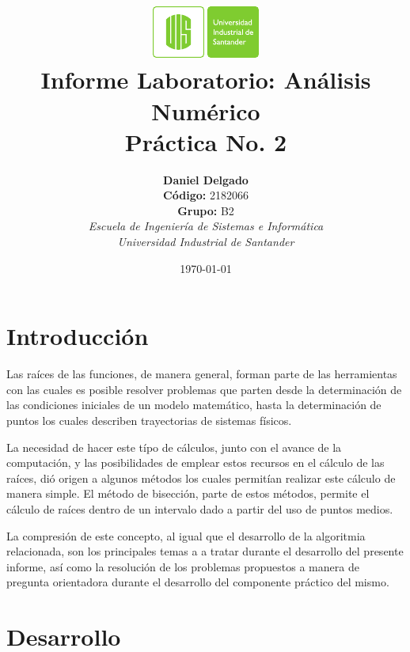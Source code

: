 \documentclass[english,notitlepage,letterpaper, 10pt]{article} %
\newcommand{\university}{\normalsize Universidad Industrial de Santander}
\newcommand{\faculty}{\normalsize  Escuela de Ingenier\'ia de Sistemas e Inform\'atica}
\newcommand{\codigo}{\normalsize  2182066}
\begin{document}
\title{	\vspace{-12mm}\includegraphics[width=0.2\linewidth]{Logos/UIS.pdf}\\Informe Laboratorio: An\'alisis Num\'erico\\  \centering Pr\'actica No. 2}
\author{
\textbf{Daniel Delgado} \\ \textbf{C\'odigo:} \codigo\\
\textbf{Grupo:} B2\\
\textit{\faculty}\\
\textit{\university}}
\date{\today}
\maketitle

\section{Introducci\'on}

Las raíces de las funciones, de manera general, forman parte de las herramientas con las cuales es posible resolver problemas que parten desde la determinación de las condiciones iniciales de un modelo matemático, hasta la determinación de puntos los cuales describen trayectorias de sistemas físicos. 

La necesidad de hacer este típo de cálculos, junto con el avance de la computación, y las posibilidades de emplear estos recursos en el cálculo de las raíces, dió origen a algunos métodos los cuales permitían realizar este cálculo de manera simple. El método de bisección, parte de estos métodos, permite el cálculo de raíces dentro de un intervalo dado a partir del uso de puntos medios. 

La compresión de este concepto, al igual que el desarrollo de la algoritmia relacionada, son los principales temas a a tratar durante el desarrollo del presente informe, así como la resolución de los problemas propuestos a manera de pregunta orientadora durante el desarrollo del componente práctico del mismo.

\section{Desarrollo}
\end{document}
